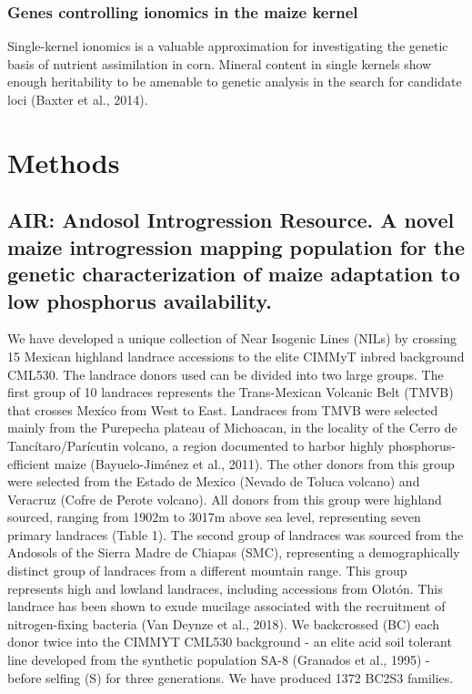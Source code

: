 \subsubsection{Genes controlling ionomics in the maize kernel}

Single-kernel ionomics is a valuable approximation for investigating the genetic basis of nutrient  assimilation in corn.
Mineral content in single kernels show enough heritability to be amenable to genetic analysis in the search for candidate loci (Baxter et al., 2014). 

\section{Methods}

\subsection{AIR: Andosol Introgression Resource. A novel maize introgression mapping population for the genetic characterization of maize adaptation to low phosphorus availability.} 
We have developed a unique collection of Near Isogenic Lines (NILs) by crossing 15 Mexican highland landrace accessions to the elite CIMMyT inbred background CML530.
The landrace donors used can be divided into two large groups. The first group of 10 landraces represents the Trans-Mexican Volcanic Belt (TMVB) that crosses Mexíco from West to East.
Landraces from TMVB were selected mainly from the Purepecha plateau of Michoacan, in the locality of the Cerro de Tancítaro/Parícutin volcano, a region documented to harbor highly phosphorus-efficient maize (Bayuelo-Jiménez et al., 2011). The other donors from this group were selected from the Estado de Mexico (Nevado de Toluca volcano) and Veracruz (Cofre de Perote volcano).
All donors from this group were highland sourced, ranging from 1902m to 3017m above sea level, representing seven primary landraces (Table 1). The second group of landraces was sourced from the Andosols of the Sierra Madre de Chiapas (SMC), representing a demographically distinct group of landraces from a different mountain range. This group represents high and lowland landraces, including accessions from Olotón. This landrace has been shown to exude mucilage associated with the recruitment of nitrogen-fixing bacteria (Van Deynze et al., 2018).
We backcrossed (BC) each donor twice into the CIMMYT CML530 background - an elite acid soil tolerant line developed from the synthetic population SA-8 (Granados et al., 1995) - before selfing (S) for three generations. We have produced 1372 BC2S3 families.
